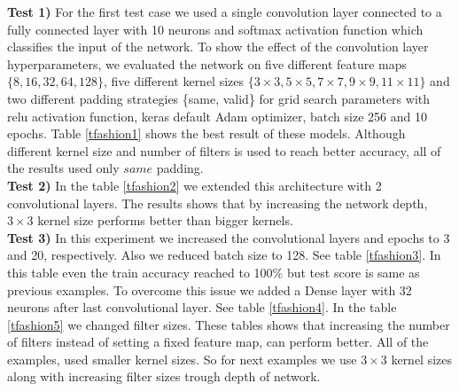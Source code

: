 \documentclass[10pt]{SelfArx} %
\begin{document}
\textbf{Test 1)}  For the first test case we used a single convolution layer connected to a fully connected layer with 10 neurons and softmax activation function which classifies the input of the network. To show the effect of the convolution layer hyperparameters, we evaluated the network on five different feature maps $\{8,16,32,64,128\}$, five different kernel sizes $\{3\times3, 5\times5, 7\times7,9\times9,11\times11\}$ and two different padding strategies \{same, valid\} for grid search parameters with relu activation function, keras default Adam optimizer, batch size 256 and 10 epochs. Table \ref{tfashion1} shows the best result of these models. Although different kernel size and number of filters is used to reach better accuracy, all of the results used only $same$ padding. 
\\
\textbf{Test 2)} In the table \ref{tfashion2} we extended this architecture with 2 convolutional layers. The results shows that by increasing the network depth, $3\times3$ kernel size performs better than bigger kernels.
\\
\textbf{Test 3)} In this experiment we increased the convolutional layers and epochs to 3 and 20, respectively. Also we reduced batch size to 128. See table \ref{tfashion3}. In this table even the train accuracy reached to 100\% but test score is same as previous examples. To overcome this issue we added a Dense layer with 32 neurons after last convolutional layer. See table  \ref{tfashion4}. In the table \ref{tfashion5} we changed filter sizes. These tables shows that increasing the number of filters instead of setting a fixed feature map, can perform better. All of the examples, used smaller kernel sizes. So for next examples we use $3\times3$ kernel sizes along with increasing filter sizes trough depth of network.
\end{document}
